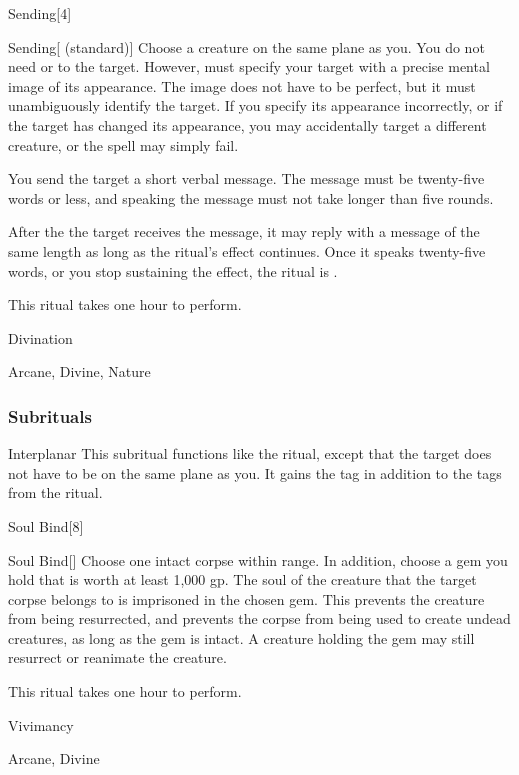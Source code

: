\begin{spellsection}{Sending}[4]


\begin{ability}{Sending}[ (standard)]
Choose a creature on the same plane as you.
You do not need  or  to the target.
However,  must specify your target with a precise mental image of its appearance.
The image does not have to be perfect, but it must unambiguously identify the target.
If you specify its appearance incorrectly, or if the target has changed its appearance, you may accidentally target a different creature, or the spell may simply fail.

You send the target a short verbal message.
The message must be twenty-five words or less, and speaking the message must not take longer than five rounds.

After the the target receives the message, it may reply with a message of the same length as long as the ritual's effect continues.
Once it speaks twenty-five words, or you stop sustaining the effect, the ritual is .

This ritual takes one hour to perform.
\end{ability}




 Divination

 Arcane, Divine, Nature
\end{spellsection}


\subsubsection{Subrituals}


\begin{ability}[\nth{6}]{Interplanar}
This subritual functions like the  ritual, except that the target does not have to be on the same plane as you.
It gains the  tag in addition to the tags from the  ritual.
\end{ability}
\vspace{0.25em}


\begin{spellsection}{Soul Bind}[8]


\begin{ability}{Soul Bind}[]
Choose one intact corpse within \rngclose range.
In addition, choose a gem you hold that is worth at least 1,000 gp.
The soul of the creature that the target corpse belongs to is imprisoned in the chosen gem.
This prevents the creature from being resurrected, and prevents the corpse from being used to create undead creatures, as long as the gem is intact.
A creature holding the gem may still resurrect or reanimate the creature.

This ritual takes one hour to perform.
\end{ability}




 Vivimancy

 Arcane, Divine
\end{spellsection}



